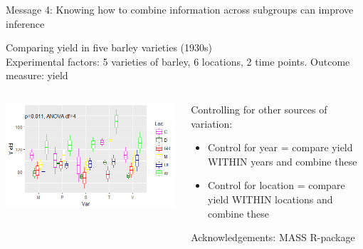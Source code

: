 \documentclass[10pt]{beamer}
\begin{document}
\begin{frame}{Message 4: Knowing how to combine information across subgroups  can improve inference}
 
  
 Comparing yield in five barley varieties (1930s) \\
 Experimental factors: 5 varieties of barley, 6 locations, 2 time points. Outcome measure: yield
  \begin{columns}
    \begin{column}{0.5\textwidth}
	\begin{center}
	\includegraphics[width=\textwidth]{Figures/message4c}
	\end{center}
    \end{column}
    
    \begin{column}{0.5\textwidth}
    \begin{block}{Controlling for other sources of variation:}
      \begin{itemize}
	\item Control for year = compare yield WITHIN years and combine these
	\item Control for location = compare yield WITHIN locations and combine these
      \end{itemize}
      \end{block}
      \tiny Acknowledgements: MASS R-package
    \end{column}
  \end{columns}
   
\end{frame}
\end{document}
